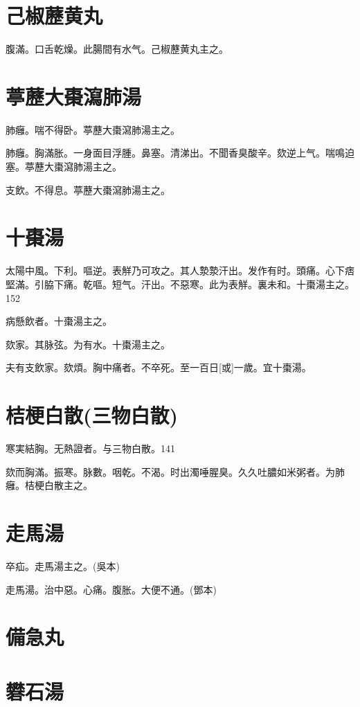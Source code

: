 \documentclass[12pt,twoside,UTF8,b5paper]{ctexbook}
\begin{document}
\section{己椒藶黄丸}

腹滿。口舌乾燥。此腸間有水气。己椒藶黄丸主之。

\section{葶藶大棗瀉肺湯}

肺癰。喘不得卧。葶藶大棗瀉肺湯主之。

肺癰。胸滿胀。一身面目浮腫。鼻塞。清涕出。不聞香臭酸辛。欬逆上气。喘鳴迫塞。葶藶大棗瀉肺湯主之。

支飲。不得息。葶藶大棗瀉肺湯主之。

\section{十棗湯}

太陽中風。下利。嘔逆。表觧乃可攻之。其人漐漐汗出。发作有时。頭痛。心下痞堅滿。引脇下痛。乾嘔。短气。汗出。不惡寒。此为表觧。裏未和。十棗湯主之。152

病懸飲者。十棗湯主之。

欬家。其脉弦。为有水。十棗湯主之。

夫有支飲家。欬煩。胸中痛者。不卒死。至一百日[或]一歲。宜十棗湯。

\section{桔梗白散(三物白散)}

寒実結胸。无熱證者。与三物白散。141

欬而胸滿。振寒。脉數。咽乾。不渴。时出濁唾腥臭。久久吐膿如米粥者。为肺癰。桔梗白散主之。

\section{走馬湯}

卒疝。走馬湯主之。(吳本)

走馬湯。治中惡。心痛。腹胀。大便不通。(鄧本)

\section{備急丸}

\section{礬石湯}
\end{document}
